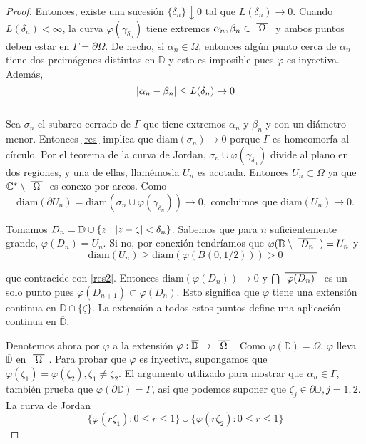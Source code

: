 \begin{proof}
Entonces, existe una sucesión $\{ \delta_n\} \downarrow 0$ tal que $L(\delta_n) \rightarrow 0$. Cuando $L(\delta_n) < \infty$, la curva $\varphi(\gamma_{\delta_n})$ tiene extremos $\alpha_n, \beta_n \in \xbar{\Omega}$ y ambos puntos deben estar en $\Gamma = \partial \Omega$. De hecho, si $\alpha_n \in \Omega$, entonces algún punto cerca de $\alpha_n$ tiene dos preimágenes distintas en $\mathbb{D}$ y esto es imposible pues $\varphi$ es inyectiva. Además, 
\begin{equation}\label{res}
\left\lvert\alpha_n - \beta_n\right\rvert \leq L(\delta_n) \rightarrow 0
\end{equation}
\\
Sea $\sigma_n$ el subarco cerrado de $\Gamma$ que tiene extremos $\alpha_n$ y $\beta_n$ y con un diámetro menor. Entonces \ref{res} implica que $\text{diam}(\sigma_n) \rightarrow 0$ porque $\Gamma$ es homeomorfa al círculo. Por el teorema de la curva de Jordan, $\sigma_n \cup \varphi(\gamma_{\delta_n})$ divide al plano en dos regiones, y una de ellas, llamémosla $U_n$ es acotada. Entonces $U_n \subset \Omega$ ya que $\mathbb{C}^* \setminus \xbar{\Omega}$ es conexo por arcos. Como
\begin{equation}
\label{res2}
\text{diam}(\partial U_n) = \text{diam}(\sigma_n \cup \varphi(\gamma_{\delta_n})) \rightarrow 0,
\text{ concluimos que }
\text{diam}(U_n) \rightarrow 0.
\end{equation} 

Tomamos $D_n = \mathbb{D} \cup \{ z: \left\lvert z - \zeta\right\rvert < \delta_n \}$. Sabemos que para $n$ suficientemente grande, $\varphi(D_n) = U_n$. Si no, por conexión tendríamos que $\varphi(\mathbb{D} \setminus \xbar{D_n}) = U_n$ y
\begin{equation*}
\text{diam} (U_n) \geq \text{diam} (\varphi(B(0, 1/2))) > 0
\end{equation*}

que contracide con \ref{res2}. Entonces $\text{diam}(\varphi(D_n)) \rightarrow 0$ y $\bigcap \xbar{\varphi(D_n)}$ es un solo punto pues $\varphi(D_{n+1}) \subset \varphi(D_n)$. Esto significa que $\varphi$ tiene una extensión continua en $\mathbb{D} \cap \{ \zeta \}$. La extensión a todos estos puntos define una aplicación continua en $\overline{\mathbb{D}}$.

Denotemos ahora por $\varphi$ a la extensión $\varphi : \overline{\mathbb{D}} \rightarrow \xbar{\Omega}$. Como $\varphi(\mathbb{D}) = \Omega$, $\varphi$ lleva  $\overline{\mathbb{D}}$ en $\xbar{\Omega}$. Para probar que $\varphi$ es inyectiva, supongamos que $\varphi(\zeta_1) = \varphi(\zeta_2), \zeta_1 \not = \zeta_2$. El argumento utilizado para mostrar que $\alpha_n \in \Gamma$, también prueba que $\varphi (\partial \mathbb{D}) = \Gamma$, así que podemos suponer que $\zeta_j \in \partial \mathbb{D}, j=1,2$. La curva de Jordan
\begin{equation*}
\{\varphi (r \zeta_1) : 0 \leq r \leq 1\} \cup \{\varphi (r \zeta_2) : 0 \leq r \leq 1\}
\end{equation*}


\end{proof}
